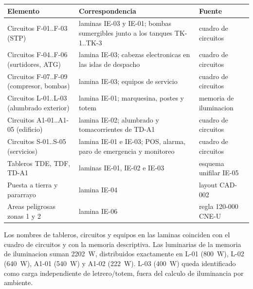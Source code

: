 \begin{center}
\small
\begin{tabularx}{\linewidth}{@{}L X L@{}}
\toprule
Elemento & Correspondencia & Fuente \\
\midrule
Circuitos F-01..F-03 (STP) & laminas IE-03 y IE-01; bombas sumergibles junto a
  los tanques TK-1..TK-3 & cuadro de circuitos \\
Circuitos F-04..F-06 (surtidores, ATG) & lamina IE-03; cabezas electronicas en
  las islas de despacho & cuadro de circuitos \\
Circuitos F-07..F-09 (compresor, bombas) & lamina IE-03; equipos de servicio &
  cuadro de circuitos \\
Circuitos L-01..L-03 (alumbrado exterior) & lamina IE-01; marquesina, postes y
  totem & memoria de iluminacion \\
Circuitos A1-01..A1-05 (edificio) & lamina IE-02; alumbrado y tomacorrientes de
  TD-A1 & cuadro de circuitos \\
Circuitos S-01..S-05 (servicios) & lamina IE-01 e IE-03; POS, alarma, paro de
  emergencia y monitoreo & cuadro de circuitos \\
Tableros TDE, TDF, TD-A1 & laminas IE-01, IE-02 e IE-03 & esquema unifilar IE-05 \\
Puesta a tierra y pararrayo & lamina IE-04 & layout CAD-002 \\
Areas peligrosas zonas 1 y 2 & lamina IE-06 & regla 120-000 CNE-U \\
\bottomrule
\end{tabularx}
\end{center}

Los nombres de tableros, circuitos y equipos en las laminas coinciden con el
cuadro de circuitos y con la memoria descriptiva. Las luminarias de la memoria
de iluminacion suman 2202~W, distribuidos exactamente en L-01 (800~W), L-02
(640~W), A1-01 (540~W) y A1-02 (222~W). L-03 (400~W) queda identificado como
carga independiente de letrero/totem, fuera del calculo de iluminancia por
ambiente.
